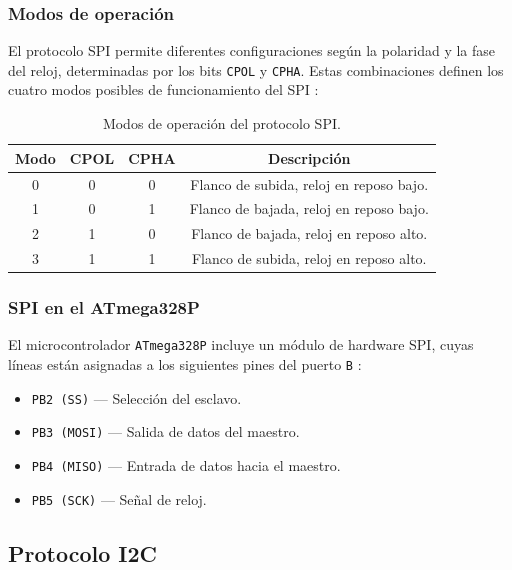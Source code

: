 \subsubsection*{Modos de operación}

El protocolo SPI permite diferentes configuraciones según la polaridad y la fase del reloj, determinadas por los bits \texttt{CPOL} y \texttt{CPHA}.  
Estas combinaciones definen los cuatro modos posibles de funcionamiento del SPI \cite{horowitz_art_of_electronics_2022, atmega328p_datasheet}:

\begin{table}[H]
    \centering
    \small
    \caption{Modos de operación del protocolo SPI.}
    \label{tab:spi_modes}
    \begin{tabular}{@{}cccc@{}}
        \toprule
        \textbf{Modo} & \textbf{CPOL} & \textbf{CPHA} & \textbf{Descripción} \\
        \midrule
        0 & 0 & 0 & Flanco de subida, reloj en reposo bajo. \\
        1 & 0 & 1 & Flanco de bajada, reloj en reposo bajo. \\
        2 & 1 & 0 & Flanco de bajada, reloj en reposo alto. \\
        3 & 1 & 1 & Flanco de subida, reloj en reposo alto. \\
        \bottomrule
    \end{tabular}
\end{table}

\subsubsection*{SPI en el ATmega328P}

El microcontrolador \texttt{ATmega328P} incluye un módulo de hardware SPI, cuyas líneas están asignadas a los siguientes pines del puerto \texttt{B} \cite{atmega328p_datasheet}:

\begin{itemize}
    \item \texttt{PB2 (SS)} — Selección del esclavo.
    \item \texttt{PB3 (MOSI)} — Salida de datos del maestro.
    \item \texttt{PB4 (MISO)} — Entrada de datos hacia el maestro.
    \item \texttt{PB5 (SCK)} — Señal de reloj.
\end{itemize}

\subsection{Protocolo I2C}

